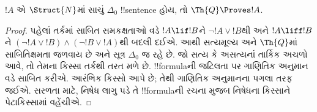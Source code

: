 \documentclass[../../../include/open-logic-section]{subfiles}
\begin{document}
\begin{lem}
$!A$ એ $\Struct{N}$માં સાચું
$\Delta_0$ !!{sentence} હોય,
તો $\Th{Q} \Proves !A$.
\end{lem}

\begin{proof}
પહેલાં તર્કમાં સાબિત સમકક્ષતાઓ વડે
$!A\lif!B$ને $\lnot!A\lor!B$થી અને
$!A\liff!B$ને $(\lnot!A\lor!B)\land(\lnot!B\lor!A)$થી
બદલી દઈએ. આથી સત્યમૂલ્ય અને $\Th{Q}$માં સાબિતિક્ષમતા
જળવાય છે અને સૂત્ર $\Delta_0$ જ રહે છે.
જો સત્ય કે અસત્યનાં તાર્કિક અચળો આવે, તો તેમના કિસ્સા
તર્કથી તરત મળે છે.
!!{formula}ની જટિલતા પર
ગાણિતિક અનુમાન વડે સાબિત કરીએ.
%
આરંભિક કિસ્સો
આપે છે; તેથી ગાણિતિક અનુમાનના
પગલા તરફ જઈએ. સરળતા માટે,
નિષેધ લાગુ પડે તે
!!{formula}ની રચના મુજબ
નિષેધના કિસ્સાને પેટાકિસ્સામાં
વહેંચીએ.


\end{proof}
\end{document}
